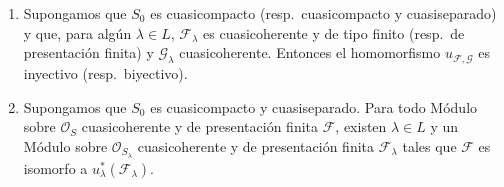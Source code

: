 \begin{theorem}[8.5.2]
\label{IV.8.5.2-fr}
\begin{enumerate}[label=\textup{(\roman*)}]
  \item Supongamos que $S_0$ es cuasicompacto (\textup{resp.}\ cuasicompacto y cuasiseparado) y que, para algún $\lambda\in L$, $\mathcal F_\lambda$ es cuasicoherente y de tipo finito (\textup{resp.}\ de presentación finita) y $\mathcal G_\lambda$ cuasicoherente.
Entonces el homomorfismo $u_{\mathcal F,\mathcal G}$ es inyectivo (\textup{resp.}\ biyectivo).
  \item Supongamos que $S_0$ es cuasicompacto y cuasiseparado.
Para todo Módulo sobre $\mathcal O_S$ cuasicoherente y de presentación finita $\mathcal F$, existen $\lambda\in L$ y un Módulo sobre $\mathcal O_{S_\lambda}$ cuasicoherente y de presentación finita $\mathcal F_\lambda$ tales que $\mathcal F$ es isomorfo a $u_\lambda^*(\mathcal F_\lambda)$.
\end{enumerate}
\end{theorem}

